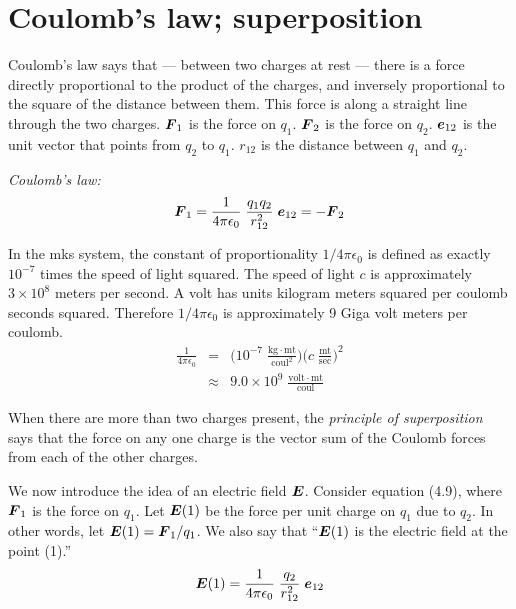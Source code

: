 \section{Coulomb's law; superposition}

Coulomb's law says that --- between two charges at rest ---
there is a force directly proportional to the product of the charges,
and inversely proportional to the square of the distance between them.
This force is along a straight line through the two charges.
$\boldsymbol{F}_1$ is the force on $q_1$.
$\boldsymbol{F}_2$ is the force on $q_2$.
$\boldsymbol{e}_{12}$ is the unit vector that points from $q_2$ to $q_1$.
$r_{12}$ is the distance between $q_1$ and $q_2$.

\hspace{2em}\emph{Coulomb's law:}
\vspace{-0.5em}
\begin{equation}
  \boldsymbol{F}_1 = \frac{1}{4\pi\epsilon_0} \; \frac{q_1 q_2}{r^2_{12}} \; \boldsymbol{e}_{12} = - \boldsymbol{F}_2
\end{equation}

In the mks system, the constant of proportionality $1/4\pi\epsilon_0$ 
is defined as exactly $10^{-7}$ times the speed of light squared.
The speed of light $c$ is approximately $3 \times 10^8$ meters per second.
A volt has units kilogram meters squared per coulomb seconds squared.
Therefore $1/4\pi\epsilon_0$ is approximately 9 Giga volt meters per coulomb.
\begin{eqnarray}
  \frac{1}{4\pi\epsilon_0} &=& 
  \Big( 10^{-7} \; \textstyle{\frac{\mathrm{kg} \cdot \mathrm{mt}}{\mathrm{coul}^2}} \Big)
  \Big( c \; \textstyle{\frac{\mathrm{mt}}{\mathrm{sec}}} \Big)^2 \nonumber\\
  &\approx& 9.0 \times 10^9 \; \textstyle{\frac{\mathrm{volt} \cdot \mathrm{mt}}{\mathrm{coul}}}
\end{eqnarray}

When there are more than two charges present,
the \emph{principle of superposition} says that the force on any one charge
is the vector sum of the Coulomb forces from each of the other charges.

We now introduce the idea of an electric field $\boldsymbol{E}$.
Consider equation (4.9), where $\boldsymbol{F}_1$ is the force on $q_1$.
Let $\boldsymbol{E}(1)$ be the force per unit charge on $q_1$ due to $q_2$.
In other words, let $\boldsymbol{E}(1) = \boldsymbol{F}_1 / q_1$.
We also say that ``$\boldsymbol{E}(1)$ is the electric field at the point (1).''
\begin{equation}
  \boldsymbol{E}(1) = \frac{1}{4\pi\epsilon_0} \; \frac{q_2}{r^2_{12}} \; \boldsymbol{e}_{12}
\end{equation}

